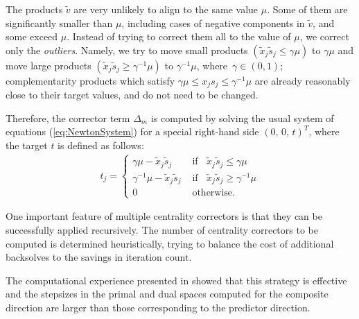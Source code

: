 The products $\tilde v$ are very unlikely to align to the same value $\mu$.
Some of them are significantly smaller than $\mu$, 
including cases of negative components in $\tilde v$, 
and some exceed $\mu$. Instead of trying to correct 
them all to the value of $\mu$, we correct only the {\it outliers}. 
Namely, we try to move small products 
$(\tilde x_j \tilde s_j \leq \gamma \mu)$ to $\gamma \mu$ and move 
large products $(\tilde x_j \tilde s_j \geq \gamma^{-1} \mu)$ 
to $\gamma^{-1} \mu$, where $\, \gamma \in (0,1)$;
complementarity products 
which satisfy $\gamma \mu \leq x_j s_j \leq \gamma^{-1} \mu$ are
already reasonably close to their target values, and 
do not need to be changed. 

Therefore, the corrector term $\Delta_m$ is computed by solving the usual 
system of equations (\ref{eq:NewtonSystem}) for a special right-hand side
$(0, \,0,\, t)^T$, where the target $t$ is defined as follows:
%
\begin{eqnarray} \label{eq:Target}
  t_j = \left\{
  \begin{array}{ll}
    \gamma \mu - \tilde x_j \tilde s_j  
    & \mbox{ if } \;\; \tilde x_j \tilde s_j \leq \gamma \mu  \\
    \gamma^{-1} \mu - \tilde x_j \tilde s_j  
    & \mbox{ if } \;\; \tilde x_j \tilde s_j \geq \gamma^{-1} \mu  \\
    0    
    & \mbox{ otherwise.}
  \end{array}
  \right.
\end{eqnarray}


One important feature of multiple centrality correctors is that they
can be successfully applied recursively. 
The number of centrality correctors to be computed is determined 
heuristically, trying to balance the cost of additional backsolves to 
the savings in iteration count.


The computational experience presented in \cite{Gondzio96} showed 
that this strategy is effective and the stepsizes in the primal and 
dual spaces computed for the composite direction are larger than 
those corresponding to the predictor direction. 

